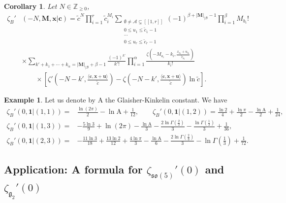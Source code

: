 \documentclass[a4paper]{amsart}
\newtheorem{corollary}[theorem]{Corollary}
\theoremstyle{remark}
\theoremstyle{definition}
\newtheorem{example}[theorem]{Example}
\newcommand{\glaisher}{\mathrm{A}}
\begin{document}
\begin{corollary}
\label{cor:barnes_derivative_formula}
Let $N \in \mathbb{Z}_{\geq 0}$,
\begin{align}
    \zeta_B'&(-N,\mathbf{M},\mathbf{x}|\mathbf{c}) = \tilde{c}^{N} \prod_{i=1}^r \tilde{c}_i^{M_i} \sum_{\substack{\emptyset \neq \mathcal{A} \subsetneq [\![1,r]\!] \\ 0 \leq u_1 \leq \tilde{c}_1-1 \\ \cdots \\ 0 \leq u_r \leq \tilde{c}_r-1}} (-1)^{\beta+|\mathbf{M}|_{|\mathcal{B}}-1} \prod_{i=1}^{\beta} M_{b_i}! \label{eq:zeta_barnes_prime} \\
    & \times \sum_{k'+k_1+\cdots+k_{\alpha}=|\mathbf{M}|_{|\mathcal{B}}+\beta-1} \frac{(-1)^{k'}}{k'!} \prod_{i=1}^{\alpha} \frac{\zeta \left( -M_{a_i}-k_i,\frac{x_{a_i}+u_{a_i}}{\tilde{c}_{a_i}} \right)}{k_i!} \nonumber \\
    & \qquad \times \left[ \zeta'\left(-N-k',\frac{\langle\mathbf{c},\mathbf{x}+\mathbf{u}\rangle}{\tilde{c}}\right)-\zeta\left(-N-k',\frac{\langle\mathbf{c},\mathbf{x}+\mathbf{u}\rangle}{\tilde{c}}\right) \ln \tilde{c} \right]. \nonumber
\end{align}
\end{corollary}

\begin{example}
\label{ex:derivative_values_barnes}
Let us denote by $\glaisher$ the Glaisher-Kinkelin constant. We have
\begin{align*}
    \zeta_B'(0,\mathbf{1}|(1,1)) =& \frac{\ln(2\pi)}{2}-\ln \glaisher +\frac{1}{12}, \qquad \zeta_B'(0,\mathbf{1}|(1,2)) = \frac{\ln 2}{4} + \frac{\ln \pi}{2} - \frac{\ln \glaisher}{2} + \frac{1}{24}, \\
    \zeta_B'(0,\mathbf{1}|(1,3)) =& -\frac{5\ln 3}{9} + \ln(2\pi) - \frac{\ln \glaisher}{3} - \frac{2\ln\Gamma\left(\frac{2}{3}\right)}{3} - \frac{\ln \Gamma\left(\frac{1}{3}\right)}{3} + \frac{1}{36}, \\
    \zeta_B'(0,\mathbf{1}|(2,3)) =& -\frac{11\ln 3}{18} + \frac{13\ln 2}{12} + \frac{4\ln \pi}{3} - \frac{\ln \glaisher}{6} - \frac{2\ln \Gamma\left( \frac{2}{3} \right)}{3} - \ln \Gamma\left( \frac{1}{3} \right) + \frac{1}{72}.
\end{align*}
\end{example}

\subsection{Application: A formula for \texorpdfstring{$\zeta_{\mathfrak{so}(5)}'(0)$}{zetaso5} and \texorpdfstring{$\zeta_{\mathfrak{g}_2}'(0)$}{zetag2}}
\label{subsection:values_zeta_witten_0}
\end{document}

